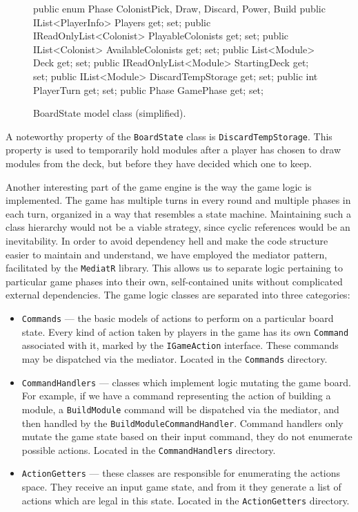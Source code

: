 \begin{figure}[ht]
\begin{code}
    public enum Phase { ColonistPick, Draw, Discard, Power, Build }
    public IList<PlayerInfo> Players { get; set; }
    public IReadOnlyList<Colonist> PlayableColonists { get; set; }
    public IList<Colonist> AvailableColonists { get; set; }
    public List<Module> Deck { get; set; }
    public IReadOnlyList<Module> StartingDeck { get; set; }
    public IList<Module> DiscardTempStorage { get; set; }
    public int PlayerTurn { get; set; }
    public Phase GamePhase { get; set; }
\end{code}
\caption{BoardState model class (simplified).}\label{dd:boardstate}
\end{figure}

A noteworthy property of the \texttt{BoardState} class is \texttt{DiscardTempStorage}.
This property is used to temporarily hold modules after a player has chosen to draw
modules from the deck, but before they have decided which one to keep.

Another interesting part of the game engine is the way the game logic is implemented.
The game has multiple turns in every round and multiple phases in each turn,
organized in a way that resembles a state machine. Maintaining such a class hierarchy
would not be a viable strategy, since cyclic references would be an inevitability.
In order to avoid dependency hell and make the code structure easier to maintain
and understand, we have employed the mediator pattern, facilitated by the
\texttt{MediatR} library. This allows us to separate logic pertaining
to particular game phases into their own, self-contained units without complicated
external dependencies. The game logic classes are separated into three categories:
\begin{itemize}
    \item \texttt{Commands} --- the basic models of actions to perform on
        a particular board state. Every kind of action taken by players in the game
        has its own \texttt{Command} associated with it, marked by the
        \texttt{IGameAction} interface. These commands may be dispatched via
        the mediator. Located in the \texttt{Commands} directory.
    \item \texttt{CommandHandlers} --- classes which implement logic mutating
        the game board. For example, if we have a command representing the action
        of building a module, a \texttt{BuildModule} command will be dispatched
        via the mediator, and then handled by the \texttt{BuildModuleCommandHandler}.
        Command handlers only mutate the game state based on their input command,
        they do not enumerate possible actions. Located in the \texttt{CommandHandlers}
        directory.
    \item \texttt{ActionGetters} --- these classes are responsible for
        enumerating the actions space. They receive an input game state,
        and from it they generate a list of actions which are legal
        in this state. Located in the \texttt{ActionGetters} directory.
\end{itemize}

